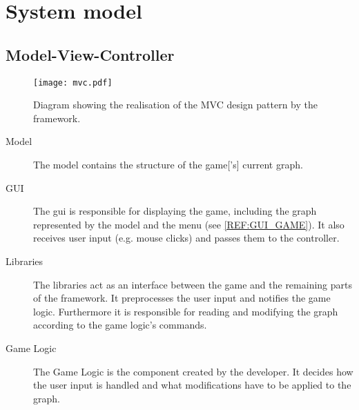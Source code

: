 \section{System model}

\subsection{Model-View-Controller}


\begin{figure}[h]
	\centering
	\texttt{[image: mvc.pdf]}
	\caption{Diagram showing the realisation of the \gls{MVC} design pattern by the framework.}
	\label{img:MVC}
\end{figure}

\begin{description}
\item[Model] The model contains the structure of the \gls{game}['s] current \gls{graph}.
\item[GUI] The \gls{gui} is responsible for displaying the game, including the \gls{graph} represented by the model and the menu (see \ref{REF:GUI_GAME}). It also receives user input (e.g. mouse clicks) and passes them to the controller.
\item[Libraries] The libraries act as an interface between the game and the remaining parts of the framework. It preprocesses the user input and notifies the game logic. Furthermore it is responsible for reading and modifying the \gls{graph} according to the game logic's commands.
\item[Game Logic] The Game Logic is the component created by the \gls{developer}. It decides how the user input is handled and what modifications have to be applied to the \gls{graph}.
\end{description}

